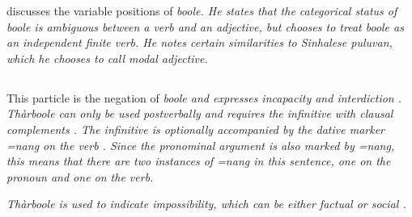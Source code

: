 %


\citet{Slomanson2003} discusses the  variable positions of \em boole\em. He states that the categorical status of \em boole \em is ambiguous between a verb and an adjective, but chooses to  treat \em  boole \em as an independent finite verb. He notes certain similarities to Sinhalese \em puluvan\em, which he chooses to call \em modal adjective\em.

\subsection{}\label{sec:wc:therboole}
This particle is the negation of \em boole \em and expresses incapacity  and interdiction .  \em Thàrboole \em can only be used postverbally and requires   the infinitive with clausal complements . The infinitive is optionally accompanied by the dative marker \em =nang \em on the verb . Since the pronominal argument is also marked by \em =nang\em, this means that there are two instances of \em =nang \em in this sentence, one on the pronoun and one on the verb.







\em Thàrboole \em is used to indicate  impossibility, which can be either factual
 or social .


